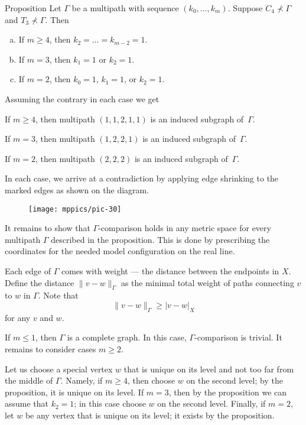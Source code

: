 \documentclass{article}
\begin{document}
\begin{thm}{Proposition}
Let $\Gamma$ be a multipath with sequence $(k_0,\dots, k_m)$.
Suppose $C_4\nprec\Gamma$ and  $T_3\nprec\Gamma$.
Then 
\begin{enumerate}[(a)]
 \item\label{lem:multipath:5} If $m\ge 4$, then $k_2=\dots=k_{m-2}=1$.
 \item\label{lem:multipath:4} If $m= 3$, then $k_1=1$ or $k_2=1$.
 \item\label{lem:multipath:3} If $m= 2$, then $k_0=1$, $k_1=1$, or $k_2=1$.
\end{enumerate}

\end{thm}

 Assuming the contrary in each case we get

If $m\ge 4$, then multipath $(1,1,2,1,1)$ is an induced subgraph of~$\Gamma$.

If $m=3$, then multipath $(1,2,2,1)$ is an induced subgraph of~$\Gamma$.

If $m=2$, then multipath $(2,2,2)$ is an induced subgraph of~$\Gamma$.

In each case, we arrive at a contradiction by applying edge shrinking to the marked edges as shown on the diagram.

\begin{figure}[h!]
\centering
\texttt{[image: mppics/pic-30]}
\end{figure}
\qedsf


It remains to show that $\Gamma$-comparison holds in any metric space for every multipath $\Gamma$ described in the proposition.
This is done by prescribing the coordinates for the needed model configuration on the real line.

Each edge of $\Gamma$ comes with weight --- the distance between the endpoints in $X$.
Define the distance $\|v-w\|_\Gamma$ as the minimal total weight of paths connecting $v$ to $w$ in $\Gamma$.
Note that 
\[\|v-w\|_\Gamma\ge |v-w|_X\]
for any $v$ and $w$.

If $m\le 1$, then $\Gamma$ is a complete graph.
In this case, $\Gamma$-comparison is trivial.
It remains to consider cases $m\ge2$.

Let us choose a special vertex $w$ that is unique on its level and not too far from the middle of $\Gamma$.
Namely, if $m\ge 4$, then choose $w$ on the second level;
by the proposition, it is unique on its level.
If $m=3$, then by the proposition we can assume that $k_2=1$; in this case choose $w$ on the second level.
Finally, if $m=2$, let $w$ be any vertex that is unique on its level; it exists by the proposition. 
\end{document}
